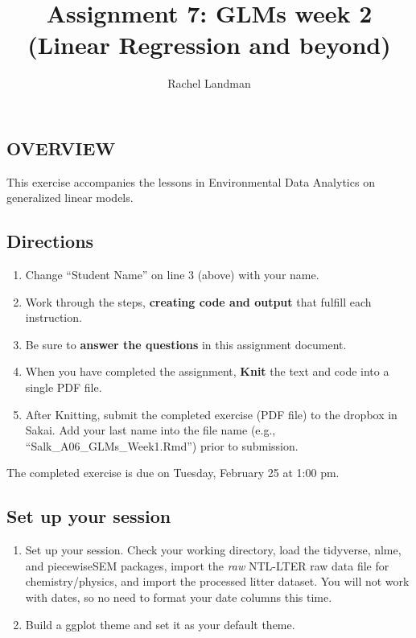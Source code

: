 \documentclass[]{article}
\title{Assignment 7: GLMs week 2 (Linear Regression and beyond)}
\author{Rachel Landman}
\date{}
\providecommand{\tightlist}{%
  \setlength{\itemsep}{0pt}\setlength{\parskip}{0pt}}
\begin{document}
\maketitle

\hypertarget{overview}{%
\subsection{OVERVIEW}\label{overview}}

This exercise accompanies the lessons in Environmental Data Analytics on
generalized linear models.

\hypertarget{directions}{%
\subsection{Directions}\label{directions}}

\begin{enumerate}
\def\labelenumi{\arabic{enumi}.}
\tightlist
\item
  Change ``Student Name'' on line 3 (above) with your name.
\item
  Work through the steps, \textbf{creating code and output} that fulfill
  each instruction.
\item
  Be sure to \textbf{answer the questions} in this assignment document.
\item
  When you have completed the assignment, \textbf{Knit} the text and
  code into a single PDF file.
\item
  After Knitting, submit the completed exercise (PDF file) to the
  dropbox in Sakai. Add your last name into the file name (e.g.,
  ``Salk\_A06\_GLMs\_Week1.Rmd'') prior to submission.
\end{enumerate}

The completed exercise is due on Tuesday, February 25 at 1:00 pm.

\hypertarget{set-up-your-session}{%
\subsection{Set up your session}\label{set-up-your-session}}

\begin{enumerate}
\def\labelenumi{\arabic{enumi}.}
\item
  Set up your session. Check your working directory, load the tidyverse,
  nlme, and piecewiseSEM packages, import the \emph{raw} NTL-LTER raw
  data file for chemistry/physics, and import the processed litter
  dataset. You will not work with dates, so no need to format your date
  columns this time.
\item
  Build a ggplot theme and set it as your default theme.
\end{enumerate}
\end{document}
